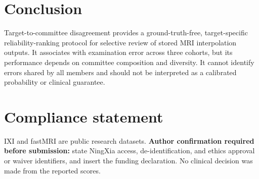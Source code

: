 \documentclass{article}
\begin{document}
\section{Conclusion}
Target-to-committee disagreement provides a ground-truth-free, target-specific reliability-ranking protocol for selective review of stored MRI interpolation outputs. It associates with examination error across three cohorts, but its performance depends on committee composition and diversity. It cannot identify errors shared by all members and should not be interpreted as a calibrated probability or clinical guarantee.

\clearpage
\section*{Compliance statement}
IXI and fastMRI are public research datasets. \textbf{Author confirmation required before submission:} state NingXia access, de-identification, and ethics approval or waiver identifiers, and insert the funding declaration. No clinical decision was made from the reported scores.



\end{document}
